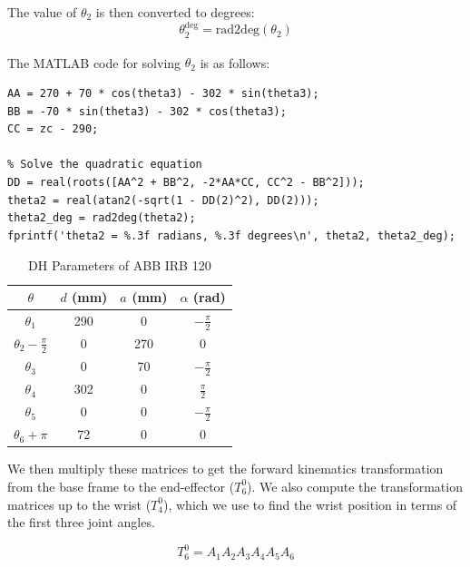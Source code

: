 The value of \(\theta_2\) is then converted to degrees:
\[
  \theta_2^{\text{deg}} = \text{rad2deg}(\theta_2)
\]


\noindent The MATLAB\textsuperscript{\textregistered} code for solving \(\theta_2\) is as follows:
\begin{lstlisting}[frame=single,style=Matlab-editor]
AA = 270 + 70 * cos(theta3) - 302 * sin(theta3);
BB = -70 * sin(theta3) - 302 * cos(theta3);
CC = zc - 290;

% Solve the quadratic equation
DD = real(roots([AA^2 + BB^2, -2*AA*CC, CC^2 - BB^2]));
theta2 = real(atan2(-sqrt(1 - DD(2)^2), DD(2)));
theta2_deg = rad2deg(theta2);
fprintf('theta2 = %.3f radians, %.3f degrees\n', theta2, theta2_deg);
\end{lstlisting}





\begin{table}[H]
  \centering
  \begin{tabular}{|c|c|c|c|}
    \hline
    \(\theta\)                   & \(d\) (mm) & \(a\) (mm) & \(\alpha\) (rad)   \\
    \hline
    \(\theta_1\)                 & 290        & 0          & \(-\frac{\pi}{2}\) \\
    \hline
    \(\theta_2 - \frac{\pi}{2}\) & 0          & 270        & 0                  \\
    \hline
    \(\theta_3\)                 & 0          & 70         & \(-\frac{\pi}{2}\) \\
    \hline
    \(\theta_4\)                 & 302        & 0          & \(\frac{\pi}{2}\)  \\
    \hline
    \(\theta_5\)                 & 0          & 0          & \(-\frac{\pi}{2}\) \\
    \hline
    \(\theta_6 + \pi\)           & 72         & 0          & 0                  \\
    \hline
  \end{tabular}
  \caption{DH Parameters of ABB IRB 120}
\end{table}

\noindent We then multiply these matrices to get the forward kinematics transformation from the base frame to the end-effector (\(T_6^0\)). We also compute the transformation matrices up to the wrist (\(T_4^0\)), which we use to find the wrist position in terms of the first three joint angles.



\[
  T_6^0 = A_1 A_2 A_3 A_4 A_5 A_6
\]

